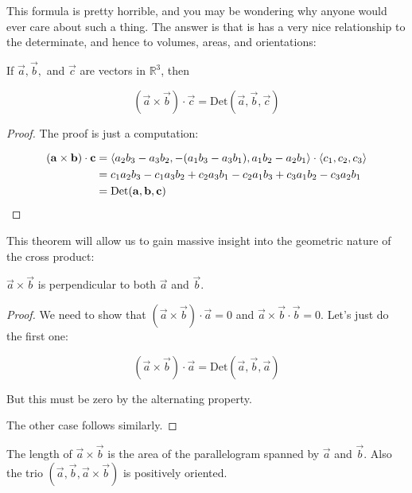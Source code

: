 \documentclass{ximera}
\begin{document}
This formula is pretty horrible, and you may be wondering why anyone would ever care about such a thing.  The answer is that is has a very nice relationship to the determinate, and hence to volumes, areas, and orientations:

\begin{theorem}
If $\vec{a},\vec{b},$ and $\vec{c}$ are vectors in $\mathbb{R}^3$, then 

\[
(\vec{a} \times \vec{b}) \cdot \vec{c} = \textrm{Det}(\vec{a},\vec{b},\vec{c}) 
\]
\end{theorem}

\begin{proof}

The proof is just a computation:

\begin{align*}
	(\mathbf{a} \times \mathbf{b}) \cdot \mathbf{c} &= \left\langle a_2b_3-a_3b_2, -(a_1b_3-a_3b_1), a_1b_2-a_2b_1\right\rangle \cdot \left\langle c_1,c_2,c_3\right\rangle\\
	&=c_1a_2b_3-c_1a_3b_2+c_2a_3b_1-c_2a_1b_3+c_3a_1b_2-c_3a_2b_1\\
	&=\textrm{Det}(\mathbf{a},\mathbf{b},\mathbf{c}) 
\end{align*}
\end{proof}

This theorem will allow us to gain massive insight into the geometric nature of the cross product:

\begin{theorem}
	$\vec{a} \times \vec{b}$ is perpendicular to both $\vec{a}$ and $\vec{b}$.
\end{theorem}

\begin{proof}
	We need to show that $(\vec{a} \times \vec{b}) \cdot \vec{a} = 0 $ and $\vec{a} \times \vec{b} \cdot \vec{b} = 0$.  Let's just do the first one:
	
	\[
	(\vec{a} \times \vec{b}) \cdot \vec{a} = \textrm{Det}(\vec{a},\vec{b},\vec{a})
	\]
	
	But this must be zero by the alternating property.
	
	The other case follows similarly.
\end{proof}

\begin{theorem}
	The length of $\vec{a} \times \vec{b}$ is the area of the parallelogram spanned by $\vec{a}$ and $\vec{b}$.  Also the trio $(\vec{a},\vec{b},\vec{a} \times \vec{b})$ is positively oriented.
\end{theorem}
\end{document}

